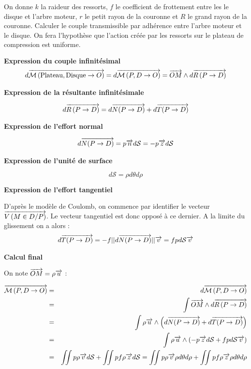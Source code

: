 \documentclass[11pt,oneside]{article}
\begin{document}
\begin{exemple}
On donne $k$ la raideur des ressorts, $f$ le coefficient de frottement entre les le disque et l'arbre moteur, $r$ le petit rayon de la couronne et $R$ le grand rayon de la couronne. Calculer le couple transmissible par adhérence entre l'arbre moteur et le disque. On fera l'hypothèse que l'action créée par les ressorts sur le plateau de compression est uniforme. 

\textbf{Expression du couple infinitésimal}
$$
d\overrightarrow{\mathcal{M}\left( {\text{Plateau}}, {\text{Disque}} \rightarrow {O}\right)} =
d\overrightarrow{\mathcal{M}\left( {P}, {D} \rightarrow {O}\right)} =  \overrightarrow{OM}\wedge d\overrightarrow{R\left( {P} \rightarrow {D}\right)}
$$

\textbf{Expression de la résultante infinitésimale}

$$
d\overrightarrow{R\left( {P} \rightarrow {D}\right)} = d\overrightarrow{N(P\rightarrow D)}+d\overrightarrow{T(P\rightarrow D)}
$$

\textbf{Expression de l'effort normal}

$$
d\overrightarrow{N(P\rightarrow D)} = p \overrightarrow{n} d\mathcal{S} = -p \overrightarrow{z} d\mathcal{S}
$$

\textbf{Expression de l'unité de surface}

$$
d\mathcal{S} = \rho d\theta d\rho
$$

\textbf{Expression de l'effort tangentiel}

D'après le modèle de Coulomb, on commence par identifier le vecteur $\overrightarrow{V\left( {M} \in {D}/{P}\right)}$.
Le vecteur tangentiel est donc opposé à ce dernier. A la limite du glissement on a alors : 
$$
d\overrightarrow{T(P\rightarrow D)} = -f ||d\overrightarrow{N(P\rightarrow D)}|| \overrightarrow{v}    = fp d\mathcal{S}\overrightarrow{v}
$$

\textbf{Calcul final}

On note $\overrightarrow{OM}=\rho\overrightarrow{u}$ :

\begin{eqnarray*}
\overrightarrow{\mathcal{M}\left( {P}, {D} \rightarrow {O}\right)}  
&=& d\overrightarrow{\mathcal{M}\left( {P}, {D} \rightarrow {O}\right)}  \\
&=& \int \overrightarrow{OM}\wedge d\overrightarrow{R\left( {P} \rightarrow {D}\right)} \\
&=& \int \rho\overrightarrow{u} \wedge \left( d\overrightarrow{N(P\rightarrow D)}+d\overrightarrow{T(P\rightarrow D)} \right)\\
&=& \int \rho\overrightarrow{u} \wedge \left( -p \overrightarrow{z} d\mathcal{S} +fp d\mathcal{S}\overrightarrow{v} \right)\\
&=& \iint p\rho\overrightarrow{v} d\mathcal{S} +\iint pf\rho  \overrightarrow{z}d\mathcal{S} = 
\iint p\rho\overrightarrow{v} \rho d\theta d\rho +\iint pf\rho  \overrightarrow{z}\rho d\theta d\rho \\
\end{eqnarray*}


\end{exemple}
\end{document}
